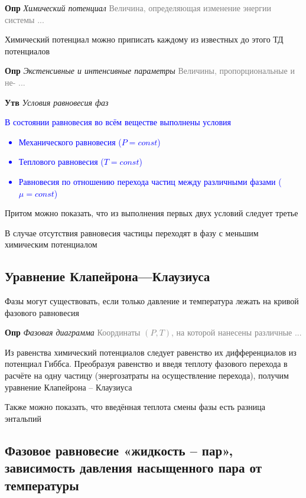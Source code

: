 \documentclass[a4paper, 14pt]{article}
\begin{document}
    \textbf{Опр} \textit{Химический потенциал} \textcolor{gray}{Величина, определяющая изменение энергии системы ...}

    Химический потенциал можно приписать каждому из известных до этого ТД потенциалов

    \textbf{Опр} \textit{Экстенсивные и интенсивные параметры} \textcolor{gray}{Величины, пропорциональные и не- ...}

    \textbf{Утв} \textit{Условия равновесия фаз}

    \textcolor{blue}{В состоянии равновесия во всём веществе выполнены условия
        \begin{itemize}
            \item Механического равновесия ($P = const$)
            \item Теплового равновесия ($T = const$)
            \item Равновесия по отношению перехода частиц между различными фазами ($\mu = const$)
        \end{itemize}}

    Притом можно показать, что из выполнения первых двух условий следует третье

    В случае отсутствия равновесия частицы переходят в фазу с меньшим химическим потенциалом

    \subsection{Уравнение Клапейрона—Клаузиуса}

    Фазы могут существовать, если только давление и температура лежать на кривой фазового равновесия

    \textbf{Опр} \textit{Фазовая диаграмма} \textcolor{gray}{Координаты $(P, T)$, на которой нанесены различные ...}

    Из равенства химический потенциалов следует равенство их дифференциалов из потенциал Гиббса.
    Преобразуя равенство и введя теплоту фазового перехода в расчёте на одну частицу (энергозатраты на осуществление
    перехода), получим уравнение Клапейрона -- Клаузиуса

    Также можно показать, что введённая теплота смены фазы есть разница энтальпий

    \subsection{Фазовое равновесие «жидкость -- пар», зависимость давления насыщенного пара от температуры}
\end{document}
